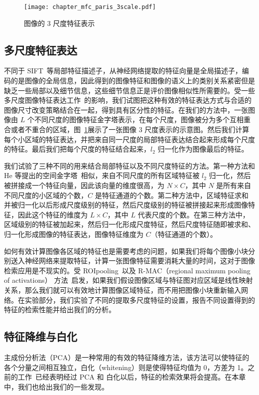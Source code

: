 \begin{figure}[!t]
	\centering
	\texttt{[image: chapter\_mfc\_paris\_3scale.pdf]}
	\caption{图像的 3 尺度特征表示}
	\label{fig:img_multiscale_feature}
\end{figure}

\subsection{多尺度特征表达}\label{subsec:multiscale_img_repr}
不同于 SIFT~\cite{Lowe2004DistinctiveIF}等局部特征描述子，从神经网络提取的特征向量是全局描述子，编码的是图像的全局信息，因此得到的图像特征和图像的语义上的类别关系紧密但是缺乏一些局部以及细节信息，这些细节信息正是评价图像相似性所需要的。受一些多尺度图像特征表达工作~\cite{Lazebnik2006BeyondBO,He2014SpatialPP}的影响，我们试图把这种有效的特征表达方式与合适的图像尺寸改变策略结合在一起，得到具有区分性的特征。在我们的方法中，一张图像由 $L$ 个不同尺度的图像特征金字塔表示，在每个尺度，图像被分为多个互相重合或者不重合的区域，图~\ref{fig:img_multiscale_feature}展示了一张图像 3 尺度表示的示意图。然后我们计算每个小区域的特征表达，并把来自同一尺度的局部特征表达结合起来形成每个尺度的特征。最后我们把每个尺度的特征结合起来，$l_2$ 归一化作为图像最后的特征。

我们试验了三种不同的用来结合局部特征以及不同尺度特征的方法。第一种方法和 He 等提出的空间金字塔~\cite{He2014SpatialPP}相似，来自不同尺度的所有区域特征被 $l_2$ 归一化，然后被拼接成一个特征向量，因此该向量的维度很高，为 $N\times C$，其中 $N$ 是所有来自不同尺度的小区域的个数，$C$ 是特征通道的个数。第二种方法中，区域特征求和并被归一化以后形成尺度级别的特征，然后尺度级别的特征被拼接起来形成图像特征，因此这个特征的维度为 $L \times C$，其中 $L$ 代表尺度的个数。在第三种方法中，区域级别的特征被加起来，然后归一化形成尺度特征，然后尺度特征随即被求和、归一化形成图像的特征表达，图像特征维度为 $C$（特征通道的个数）。

如何有效计算图像各区域的特征也是需要考虑的问题，如果我们将每个图像小块分别送入神经网络来提取特征，计算一张图像特征需要消耗大量的时间，这对于图像检索应用是不现实的。受 ROIpooling~\cite{Ren2017FasterRT}以及 R-MAC（regional maximum pooling of activations） 方法~\cite{Tolias2015ParticularOR}启发，如果我们假设图像区域与特征图对应区域是线性映射关系，那么我们就可以有效地计算图像区域特征，而不用把图像小块重新输入网络。在实验部分，我们实验了不同的提取多尺度特征的设置，报告不同设置得到的特征的检索性能并给出我们的分析。

\subsection{特征降维与白化}
主成份分析法（PCA）是一种常用的有效的特征降维方法，该方法可以使特征的各个分量之间相互独立，白化（whitening）则是使得特征均值为 0，方差为 1。之前的工作~\cite{Babenko2014NeuralCF}已经表明经过 PCA 和 白化以后，特征的检索效果将会提高。在本章中，我们也给出我们的一些发现。

